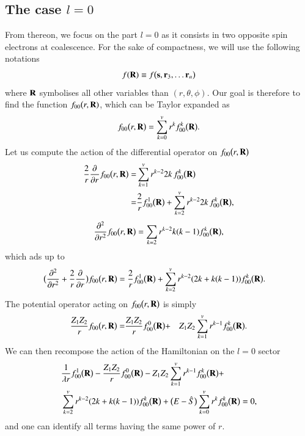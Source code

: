 \documentclass[aip,jcp,reprint,noshowkeys,superscriptaddress]{revtex4-1}
\newcommand{\deriv}[3]{\frac{\partial^{#3} #1}{\partial {#2}^{#3}}}
\newcommand{\bd}[1]{{\bf {#1}}}
\newcommand{\bs}[0]{{\bf {s}}}
\begin{document}
\subsection{The case $l=0$}
From thereon, we focus on the part $l=0$ as it consists in two opposite spin electrons at coalescence. 
For the sake of compactness, we will use the following notations 
\begin{equation}
 f(\bd{R}) \equiv f\big(\bs,\bd{r}_3, \hdots \bd{r}_n\big)
\end{equation}
where $\bd{R}$ symbolises all other variables than $(r,\theta,\phi)$. 
Our goal is therefore to find the function $f_{00}\big(r,\bd{R})$,  which can be Taylor expanded as
\begin{equation}
 f_{00}\big(r,\bd{R}\big)  = \sum_{k=0}^v r^k f_{00}^k\big(\bd{R}\big). 
\end{equation}
Let us compute the action of the differential operator on $f_{00}\big(r,\bd{R}\big)$
\begin{equation}
 \begin{aligned}
 \frac{2}{r}\deriv{}{r}{} f_{00}\big(r,\bd{R}\big) = & \sum_{k=1}^v r^{k-2} 2 k\,f_{00}^k\big(\bd{R}\big)\\
 = & \frac{2}{r}f_{00}^1\big(\bd{R}\big) +  \sum_{k=2}^v r^{k-2} 2 k\,f_{00}^k\big(\bd{R}\big), 
 \end{aligned}
\end{equation}
\begin{equation}
 \deriv{}{r}{2} f_{00}\big(r,\bd{R}\big) = \sum_{k=2}r^{k-2} k(k-1) f_{00}^k\big(\bd{R}\big),
\end{equation}
which ads up to 
\begin{equation}
 \begin{aligned}
& \big( \deriv{}{r}{2} + \frac{2}{r}\deriv{}{r}{}  \big) f_{00}\big(r,\bd{R}\big) =  \frac{2}{r}f_{00}^1\big(\bd{R}\big) +
  \sum_{k=2}^v r^{k-2} (2 k + k(k-1)) f_{00}^k\big(\bd{R}\big). 
 \end{aligned}
\end{equation}
The potential operator acting on $f_{00}\big(r,\bd{R}\big)$ is simply
\begin{equation}
 \begin{aligned}
 \frac{Z_1 Z_2}{r} f_{00}\big(r,\bd{R}\big) = & \frac{Z_1 Z_2}{r} f_{00}^0\big(\bd{R}\big)+  & Z_1 Z_2 \sum_{k=1}^v r^{k-1} f_{00}^k\big(\bd{R}\big).  
 \end{aligned}
\end{equation}
We can then recompose the action of the Hamiltonian on the $l=0$ sector 
\begin{equation}
 \begin{aligned}
 \label{eq:power_exp}
&\frac{1}{\lambda r}f_{00}^1\big(\bd{R}\big) - \frac{Z_1 Z_2}{r} f_{00}^0\big(\bd{R}\big)
- Z_1 Z_2 \sum_{k=1}^v r^{k-1} f_{00}^k\big(\bd{R}\big) + \\ 
& \sum_{k=2}^v r^{k-2} (2 k + k(k-1)) f_{00}^k\big(\bd{R}\big) +
\big( E - \hat{S} \big) \sum_{k=0}^v r^k f_{00}^k\big(\bd{R}\big) = 0, 
 \end{aligned}
\end{equation}
and one can identify all terms having the same power of $r$. 
\end{document}
